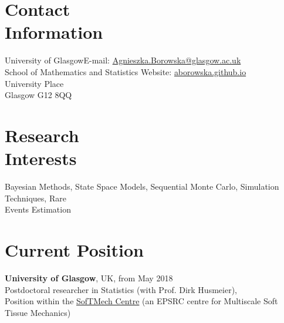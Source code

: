 \documentclass[margin,line]{resume}
\begin{document}
\begin{resume}
    \section{\mysidestyle Contact\\Information}
    University of Glasgow\hfill  E-mail: \url{Agnieszka.Borowska@glasgow.ac.uk} \\
    School of Mathematics and Statistics \hfill Website: \url{aborowska.github.io}\\ \vspace{0mm}%
    University Place \\
    Glasgow G12 8QQ\\ \vspace{-4.5mm}%
    \section{\mysidestyle Research\\Interests}
    
    Bayesian Methods, State Space Models, Sequential Monte Carlo, Simulation Techniques, Rare \\ Events Estimation

 
    \section{\mysidestyle Current Position}
    \textbf{University of Glasgow},  UK, \hfill from May 2018\\
	Postdoctoral researcher in Statistics (with Prof. Dirk Husmeier),\\ 
    Position within the \href{http://softmech.org/}{SofTMech Centre} (an EPSRC centre for Multiscale Soft Tissue Mechanics)


\end{resume}
\end{document}
